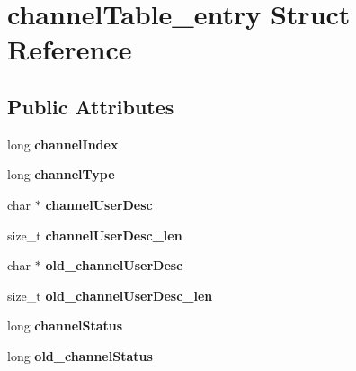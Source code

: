 \hypertarget{structchannelTable__entry}{}\section{channel\+Table\+\_\+entry Struct Reference}
\label{structchannelTable__entry}
\subsection*{Public Attributes}
\begin{DoxyCompactItemize}
\item 
long {\bfseries channel\+Index}\hypertarget{structchannelTable__entry_ab7ea4446c1749c9f55b81388307600e1}{}\label{structchannelTable__entry_ab7ea4446c1749c9f55b81388307600e1}

\item 
long {\bfseries channel\+Type}\hypertarget{structchannelTable__entry_a29eafb72ddf43af31adcb29c5fcd8883}{}\label{structchannelTable__entry_a29eafb72ddf43af31adcb29c5fcd8883}

\item 
char $\ast$ {\bfseries channel\+User\+Desc}\hypertarget{structchannelTable__entry_a16e58c42faa418e514bd126e7b097a3d}{}\label{structchannelTable__entry_a16e58c42faa418e514bd126e7b097a3d}

\item 
size\+\_\+t {\bfseries channel\+User\+Desc\+\_\+len}\hypertarget{structchannelTable__entry_a31a284cb50bbd7fbab46e8acd0c9bf25}{}\label{structchannelTable__entry_a31a284cb50bbd7fbab46e8acd0c9bf25}

\item 
char $\ast$ {\bfseries old\+\_\+channel\+User\+Desc}\hypertarget{structchannelTable__entry_a8c5de25a36b3dfdb1ba829ca28c5888e}{}\label{structchannelTable__entry_a8c5de25a36b3dfdb1ba829ca28c5888e}

\item 
size\+\_\+t {\bfseries old\+\_\+channel\+User\+Desc\+\_\+len}\hypertarget{structchannelTable__entry_a4badf9127efcd114f66453ce7bfde136}{}\label{structchannelTable__entry_a4badf9127efcd114f66453ce7bfde136}

\item 
long {\bfseries channel\+Status}\hypertarget{structchannelTable__entry_a5daff69571bd61f6a2de1afe2d10551e}{}\label{structchannelTable__entry_a5daff69571bd61f6a2de1afe2d10551e}

\item 
long {\bfseries old\+\_\+channel\+Status}\hypertarget{structchannelTable__entry_a38862dc3e9935da479fa6f6125f80ee1}{}\label{structchannelTable__entry_a38862dc3e9935da479fa6f6125f80ee1}


\end{DoxyCompactItemize}
